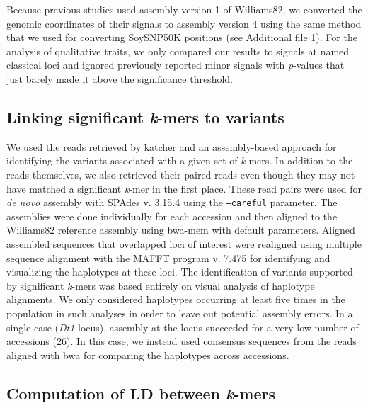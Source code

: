 \documentclass[doublespacing]{bmcart}
\begin{document}
Because previous studies \citep{bandillo2015, bandillo2017} used assembly version 1 of
Williams82, we converted the genomic coordinates of their signals to assembly version 4
using the same method that we used for converting
SoySNP50K positions (see Additional file 1). For the analysis of
qualitative traits, we only compared our results to signals at named classical
loci and ignored previously reported minor signals with \emph{p}-values that
just barely made it above the significance threshold.

\subsection*{Linking significant \emph{k}-mers to variants}

We used the reads retrieved by katcher and an assembly-based approach for
identifying the variants associated with a given set of \emph{k}-mers. In
addition to the reads themselves, we also retrieved their paired reads even
though they may not have matched a significant \emph{k}-mer in the first place.
These read pairs were used for \emph{de novo} assembly with SPAdes v. 3.15.4
\citep{spades} using the \texttt{--careful} parameter. The assemblies were done
individually for each accession and then aligned to the Williams82 reference
assembly using bwa-mem with default parameters.  Aligned assembled sequences
that overlapped loci of interest were realigned using multiple sequence
alignment with the MAFFT program v. 7.475 \citep{katoh2002} for identifying and
visualizing the haplotypes at these loci. The identification of variants
supported by significant \textit{k}-mers was based entirely on visual analysis
of haplotype alignments. We only considered haplotypes occurring at least five
times in the population in such analyses in order to leave out potential
assembly errors. In a single case (\emph{Dt1} locus), assembly at the locus
succeeded for a very low number of accessions (26). In this case, we instead used
consensus sequences from the reads aligned with bwa for comparing the
haplotypes across accessions. 

\subsection*{Computation of LD between \emph{k}-mers}
\end{document}
